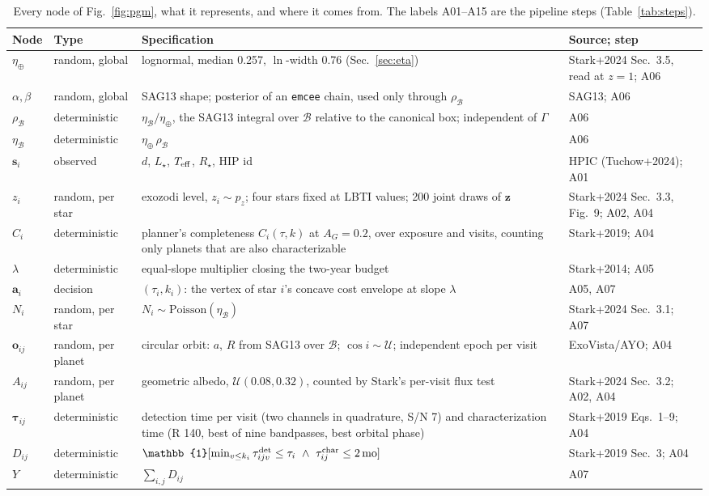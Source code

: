 \documentclass[11pt,a4paper]{article}
\begin{document}
\begin{table}[htbp]
\centering
\scriptsize
\begin{tabular}{p{1.2cm}p{3.2cm}p{5.6cm}p{3.6cm}}
\toprule
\textbf{Node} & \textbf{Type} & \textbf{Specification} & \textbf{Source; step} \\
\midrule
$\eta_\oplus$ & random, global & lognormal, median 0.257, $\ln$-width 0.76 (Sec.~\ref{sec:eta}) & Stark+2024 Sec.~3.5, read at $z=1$; A06 \\
$\alpha,\beta$ & random, global & SAG13 shape; posterior of an \texttt{emcee} chain, used only through $\rho_\mathcal{B}$ & SAG13; A06 \\
$\rho_\mathcal{B}$ & deterministic & $\eta_\mathcal{B}/\eta_\oplus$, the SAG13 integral over $\mathcal{B}$ relative to the canonical box; independent of $\Gamma$ & A06 \\
$\eta_\mathcal{B}$ & deterministic & $\eta_\oplus\,\rho_\mathcal{B}$ & A06 \\
$\mathbf{s}_i$ & observed & $d$, $L_\star$, $T_{\rm eff}$, $R_\star$, HIP id & HPIC (Tuchow+2024); A01 \\
$z_i$ & random, per star & exozodi level, $z_i \sim p_z$; four stars fixed at LBTI values; 200 joint draws of $\mathbf{z}$ & Stark+2024 Sec.~3.3, Fig.~9; A02, A04 \\
$C_i$ & deterministic & planner's completeness $C_i(\tau, k)$ at $A_G = 0.2$, over exposure and visits, counting only planets that are also characterizable & Stark+2019; A04 \\
$\lambda$ & deterministic & equal-slope multiplier closing the two-year budget & Stark+2014; A05 \\
$\mathbf{a}_i$ & decision & $(\tau_i, k_i)$: the vertex of star $i$'s concave cost envelope at slope $\lambda$ & A05, A07 \\
$N_i$ & random, per star & $N_i \sim \mathrm{Poisson}(\eta_\mathcal{B})$ & Stark+2024 Sec.~3.1; A07 \\
$\mathbf{o}_{ij}$ & random, per planet & circular orbit: $a$, $R$ from SAG13 over $\mathcal{B}$; $\cos i \sim \mathcal{U}$; independent epoch per visit & ExoVista/AYO; A04 \\
$A_{ij}$ & random, per planet & geometric albedo, $\mathcal{U}(0.08, 0.32)$, counted by Stark's per-visit flux test & Stark+2024 Sec.~3.2; A02, A04 \\
$\boldsymbol{\tau}_{ij}$ & deterministic & detection time per visit (two channels in quadrature, S/N 7) and characterization time (R 140, best of nine bandpasses, best orbital phase) & Stark+2019 Eqs.~1--9; A04 \\
$D_{ij}$ & deterministic & $\mathbb{1}[\min_{v \le k_i}\tau^{\rm det}_{ijv} \le \tau_i \ \wedge\ \tau^{\rm char}_{ij} \le 2\,\mathrm{mo}]$ & Stark+2019 Sec.~3; A04 \\
$Y$ & deterministic & $\sum_{i,j} D_{ij}$ & A07 \\
\bottomrule
\end{tabular}
\caption{Every node of Fig.~\ref{fig:pgm}, what it represents, and where it comes from. The
labels A01--A15 are the pipeline steps (Table~\ref{tab:steps}).}
\label{tab:nodes}
\end{table}
\end{document}
